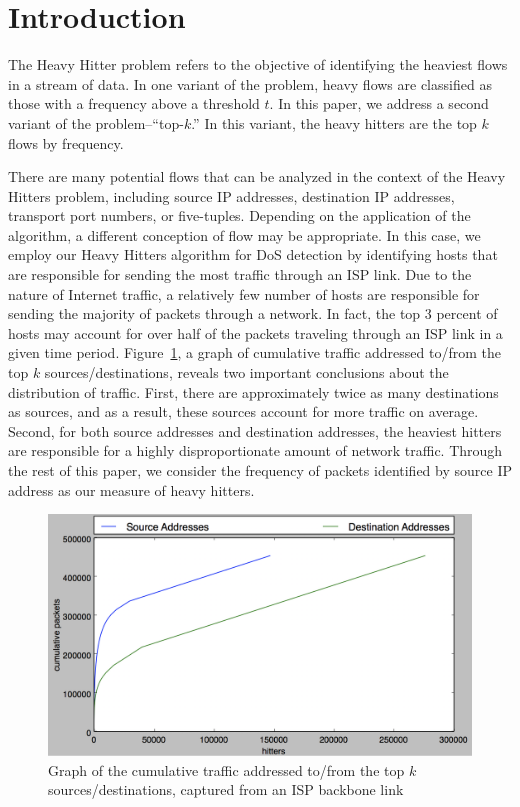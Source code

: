 \section{Introduction}
\label{sec:intro}
The Heavy Hitter problem refers to the objective of identifying the heaviest flows in a stream of data. In one variant of the problem, heavy flows are classified as those with a frequency above a threshold $t$. In this paper, we address a second variant of the problem--``top-$k$.'' In this variant, the heavy hitters are the top $k$ flows by frequency. 

There are many potential flows that can be analyzed in the context of the Heavy Hitters problem, including source IP addresses, destination IP addresses, transport port numbers, or five-tuples. Depending on the application of the algorithm, a different conception of flow may be appropriate. In this case, we employ our Heavy Hitters algorithm for DoS detection by identifying hosts that are responsible for sending the most traffic through an ISP link. Due to the nature of Internet traffic, a relatively few number of hosts are responsible for sending the majority of packets through a network. In fact, the top 3 percent of hosts may account for over half of the packets traveling through an ISP link in a given time period. Figure~\ref{fig:cumulative}, a graph of cumulative traffic addressed to/from the top $k$ sources/destinations, reveals two important conclusions about the distribution of traffic. First, there are approximately twice as many destinations as sources, and as a result, these sources account for more traffic on average. Second, for both source addresses and destination addresses, the heaviest hitters are responsible for a highly disproportionate amount of network traffic. Through the rest of this paper, we consider the frequency of packets identified by source IP address as our measure of heavy hitters.
\begin{figure}[t]
  \centering
    \includegraphics[scale=0.3]{cumulative}
     \caption{Graph of the cumulative traffic addressed to/from the top $k$ sources/destinations, captured from an ISP backbone link}
     \label{fig:cumulative}
\end{figure}